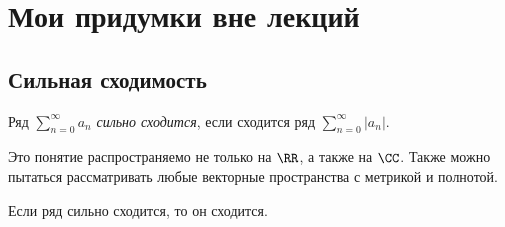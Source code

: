 \documentclass[12pt,a4paper]{article}
\begin{document}
    \section{Мои придумки вне лекций}

    \subsection{Сильная сходимость}

    \begin{definition}
        Ряд $\sum_{n=0}^\infty a_n$ \emph{сильно сходится}, если сходится ряд $\sum_{n=0}^\infty |a_n|$.
    \end{definition}

    \begin{remark*}
        Это понятие распространяемо не только на $\RR$, а также на $\CC$. Также можно пытаться рассматривать любые векторные пространства с метрикой и полнотой.
    \end{remark*}

    \begin{lemma}
        Если ряд сильно сходится, то он сходится.
    \end{lemma}
\end{document}
